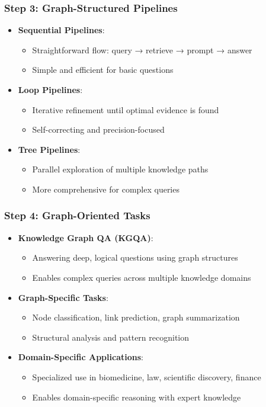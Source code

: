 \begin{frame}[fragile]\frametitle{Step 3: Graph-Structured Pipelines}
      \begin{itemize}
        \item \textbf{Sequential Pipelines}:
          \begin{itemize}
            \item Straightforward flow: query → retrieve → prompt → answer
            \item Simple and efficient for basic questions
          \end{itemize}
        \item \textbf{Loop Pipelines}:
          \begin{itemize}
            \item Iterative refinement until optimal evidence is found
            \item Self-correcting and precision-focused
          \end{itemize}
        \item \textbf{Tree Pipelines}:
          \begin{itemize}
            \item Parallel exploration of multiple knowledge paths
            \item More comprehensive for complex queries
          \end{itemize}
      \end{itemize}
\end{frame}

\begin{frame}[fragile]\frametitle{Step 4: Graph-Oriented Tasks}
      \begin{itemize}
        \item \textbf{Knowledge Graph QA (KGQA)}:
          \begin{itemize}
            \item Answering deep, logical questions using graph structures
            \item Enables complex queries across multiple knowledge domains
          \end{itemize}
        \item \textbf{Graph-Specific Tasks}:
          \begin{itemize}
            \item Node classification, link prediction, graph summarization
            \item Structural analysis and pattern recognition
          \end{itemize}
        \item \textbf{Domain-Specific Applications}:
          \begin{itemize}
            \item Specialized use in biomedicine, law, scientific discovery, finance
            \item Enables domain-specific reasoning with expert knowledge
          \end{itemize}
      \end{itemize}
\end{frame}

